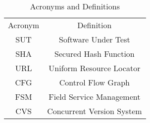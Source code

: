 \begin{table}[H]
	\centering
	\renewcommand{\arraystretch}{1.5}
	\begin{tabular}[t]{ c c }
		Acronym & Definition\\
		SUT & Software Under Test\\
		SHA & Secured Hash Function\\
		URL & Uniform Resource Locator\\
		CFG & Control Flow Graph\\
		FSM & Field Service Management\\
		CVS & Concurrent Version System\\
	\end{tabular}
	\caption{Acronyms and Definitions}
	\renewcommand{\arraystretch}{1.0}
\end{table}